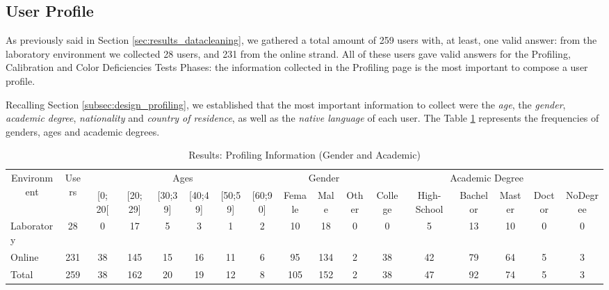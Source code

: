 \subsection{User Profile}
\label{subsec:results_userprofile}
%
As previously said in Section \ref{sec:results_datacleaning}, we gathered a total amount of 259 users with, at least, one valid answer: from the laboratory environment
we collected 28 users, and 231 from the online strand. All of these users gave valid answers for the Profiling, Calibration and Color Deficiencies Tests Phases: the information collected
in the Profiling page is the most important to compose a user profile. \par
%
Recalling Section \ref{subsec:design_profiling}, we established that the most important information to collect were the \emph{age}, the \emph{gender}, \emph{academic degree},
\emph{nationality} and \emph{country of residence}, as well as the \emph{native language} of each user. The Table \ref{table:profiling_genderacademic} represents the frequencies of genders, ages and
academic degrees. \par
%
\begin{table}[htbp]
  \resizebox{\textwidth}{!} {
    \begin{tabular}{| l || c || c | c | c | c | c | c || c | c | c || c | c | c | c | c | c |}
      \hline
      \multicolumn{1}{|c||}{\multirow{2}{*}{Environment}} & \multirow{2}{*}{Users} & \multicolumn{6}{c||}{Ages}                                                           & \multicolumn{3}{c||}{Gender} & \multicolumn{6}{c|}{Academic Degree}                          \\ \cline{3-17}
      \multicolumn{1}{|c||}{}                             &                        & {[}0; 20{[} & {[}20; 29{]} & {[}30;39{]} & {[}40;49{]} & {[}50;59{]} & {[}60;90{]} & Female   & Male   & Other   & College & High-School & Bachelor & Master & Doctor & NoDegree \\ \hline
      Laboratory                                         & 28                     & 0           & 17           & 5           & 3           & 1           & 2            & 10       & 18     & 0        & 0       & 5           & 13       & 10     & 0      & 0        \\ \hline
      Online                                             & 231                    & 38          & 145          & 15          & 16          & 11          & 6            & 95       & 134    & 2        & 38      & 42          & 79       & 64     & 5      & 3        \\ \hline \hline
      Total                                              & 259                    & 38          & 162          & 20          & 19          & 12          & 8            & 105      & 152    & 2        & 38      & 47          & 92       & 74     & 5      & 3        \\ \hline
    \end{tabular}}
  \caption[Results: Profiling Information (Gender and Academic)]{Results: Profiling Information (Gender and Academic)}
  \vspace{-5pt}
  \label{table:profiling_genderacademic}
\end{table}
